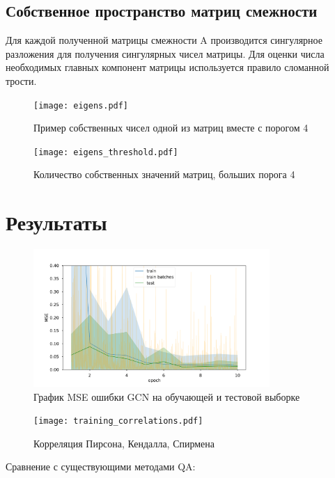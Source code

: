 \documentclass[14pt]{extarticle}
\begin{document}
\subsection{Собственное пространство матриц смежности}
Для каждой полученной матрицы смежности A производится сингулярное разложения для получения сингулярных чисел матрицы. Для оценки числа необходимых главных компонент матрицы используется правило сломанной трости.
\begin{figure}[H]
		\centering
		\texttt{[image: eigens.pdf]}
		\caption{Пример собственных чисел одной из матриц вместе с порогом 4}
		\label{fig:eigens}
\end{figure}
\begin{figure}[H]
		\centering
		\texttt{[image: eigens\_threshold.pdf]}
		\caption{Количество собственных значений матриц, больших порога 4}
		\label{fig:threshold}
\end{figure}

\section{Результаты}
\begin{figure}[H]
		\centering
		\includegraphics[width=0.8\textwidth]{training.pdf}
		\caption{График MSE ошибки GCN на обучающей и тестовой выборке}
		\label{fig:GCN}
	\end{figure}
\begin{figure}[H]
		\centering
		\texttt{[image: training\_correlations.pdf]}
		\caption{Корреляция Пирсона, Кендалла, Спирмена}
		\label{fig:correlation}
\end{figure}

Сравнение с существующими методами QA:
\end{document}
